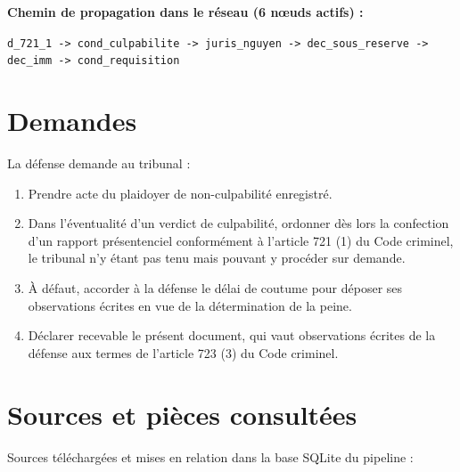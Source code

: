 \documentclass[12pt,letterpaper,oneside]{article}
\begin{document}
\textbf{Chemin de propagation dans le réseau (6 nœuds actifs) :}

\texttt{d\_721\_1 -> cond\_culpabilite -> juris\_nguyen -> dec\_sous\_reserve -> dec\_imm -> cond\_requisition}


\section{Demandes}
La défense demande au tribunal :

\begin{enumerate}[leftmargin=*]
\item Prendre acte du plaidoyer de non-culpabilité enregistré.
\item Dans l'éventualité d'un verdict de culpabilité, ordonner dès lors la confection d'un rapport présentenciel conformément à l'article 721 (1) du Code criminel, le tribunal n'y étant pas tenu mais pouvant y procéder sur demande.
\item À défaut, accorder à la défense le délai de coutume pour déposer ses observations écrites en vue de la détermination de la peine.
\item Déclarer recevable le présent document, qui vaut observations écrites de la défense aux termes de l'article 723 (3) du Code criminel.
\end{enumerate}

\section{Sources et pièces consultées}
Sources téléchargées et mises en relation dans la base SQLite du pipeline :
\end{document}
